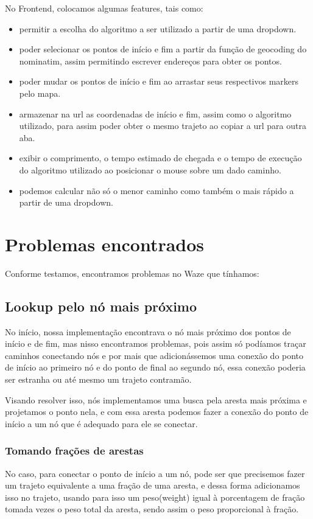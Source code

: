 \documentclass{article}
\begin{document}
No Frontend, colocamos algumas features, tais como:
\begin{itemize}
    \item permitir a escolha do algoritmo a ser utilizado a partir de uma dropdown.
    \item poder selecionar os pontos de início e fim a partir da função de geocoding do nominatim, assim permitindo escrever endereços para obter os pontos.
    \item poder mudar os pontos de início e fim ao arrastar seus respectivos markers pelo mapa.
    \item armazenar na url as coordenadas de início e fim, assim como o algoritmo utilizado, para assim poder obter o mesmo trajeto ao copiar a url para outra aba.
    \item exibir o comprimento, o tempo estimado de chegada e o tempo de execução do algoritmo utilizado ao posicionar o mouse sobre um dado caminho.
    \item podemos calcular não só o menor caminho como também o mais rápido a partir de uma dropdown.
\end{itemize}

\section{Problemas encontrados}

Conforme testamos, encontramos problemas no Waze que tínhamos:
\subsection{Lookup pelo nó mais próximo}
No início, nossa implementação encontrava o nó mais próximo dos pontos de início e de fim, mas nisso encontramos problemas, pois assim só podíamos traçar caminhos conectando nós e por mais que adicionássemos uma conexão do ponto de início ao primeiro nó e do ponto de final ao segundo nó, essa conexão poderia ser estranha ou até mesmo um trajeto contramão.

Visando resolver isso, nós implementamos uma busca pela aresta mais próxima e projetamos o ponto nela, e com essa aresta podemos fazer a conexão do ponto de início a um nó que é adequado para ele se conectar.

\subsubsection{Tomando frações de arestas}
No caso, para conectar o ponto de início a um nó, pode ser que precisemos fazer um trajeto equivalente a uma fração de uma aresta, e dessa forma adicionamos isso no trajeto, usando para isso um peso(weight) igual à porcentagem de fração tomada vezes o peso total da aresta, sendo assim o peso proporcional à fração.
\end{document}
